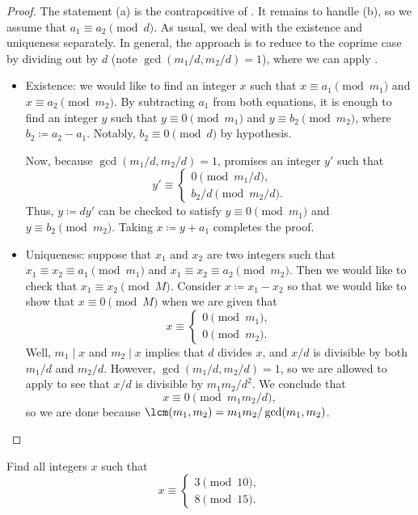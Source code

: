 \documentclass{article}
\begin{document}
\begin{proof}
	The statement (a) is the contrapositive of . It remains to handle (b), so we assume that $a_1\equiv a_2\pmod d$. As usual, we deal with the existence and uniqueness separately. In general, the approach is to reduce to the coprime case by dividing out by $d$ (note $\gcd(m_1/d,m_2/d)=1$), where we can apply .
	\begin{itemize}
		\item Existence: we would like to find an integer $x$ such that $x\equiv a_1\pmod{m_1}$ and $x\equiv a_2\pmod{m_2}$. By subtracting $a_1$ from both equations, it is enough to find an integer $y$ such that $y\equiv0\pmod{m_1}$ and $y\equiv b_2\pmod{m_2}$, where $b_2\coloneqq a_2-a_1$. Notably, $b_2\equiv0\pmod d$ by hypothesis.

		Now, because $\gcd(m_1/d,m_2/d)=1$,  promises an integer $y'$ such that
		\[y'\equiv\begin{cases}
			0 \pmod{m_1/d}, \\
			b_2/d \pmod{m_2/d}.
		\end{cases}\]
		Thus, $y\coloneqq dy'$ can be checked to satisfy $y\equiv0\pmod{m_1}$ and $y\equiv b_2\pmod{m_2}$. Taking $x\coloneqq y+a_1$ completes the proof.

		\item Uniqueness: suppose that $x_1$ and $x_2$ are two integers such that $x_1\equiv x_2\equiv a_1\pmod{m_1}$ and $x_1\equiv x_2\equiv a_2\pmod{m_2}$. Then we would like to check that $x_1\equiv x_2\pmod M$. Consider $x\coloneqq x_1-x_2$ so that we would like to show that $x\equiv0\pmod M$ when we are given that
		\[x\equiv\begin{cases}
			0\pmod{m_1}, \\
			0\pmod{m_2}.
		\end{cases}\]
		Well, $m_1\mid x$ and $m_2\mid x$ implies that $d$ divides $x$, and $x/d$ is divisible by both $m_1/d$ and $m_2/d$. However, $\gcd(m_1/d,m_2/d)=1$, so we are allowed to apply  to see that $x/d$ is divisible by $m_1m_2/d^2$. We conclude that
		\[x\equiv0\pmod{m_1m_2/d},\]
		so we are done because $\lcm(m_1,m_2)=m_1m_2/\gcd(m_1,m_2)$.
		\qedhere
	\end{itemize}
\end{proof}
\begin{exe}
	Find all integers $x$ such that
	\[x\equiv\begin{cases}
		3\pmod{10}, \\
		8\pmod{15}.
	\end{cases}\]
\end{exe}
\end{document}
